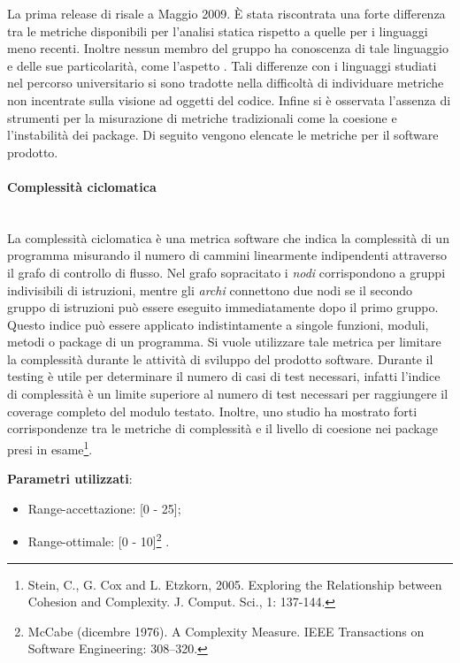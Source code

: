 		La prima release di  risale a Maggio 2009. È stata riscontrata una forte differenza tra le metriche disponibili per l'analisi statica rispetto a quelle per i linguaggi meno recenti. Inoltre nessun membro del gruppo ha conoscenza di tale linguaggio e delle sue particolarità, come l'aspetto . Tali differenze con i linguaggi studiati nel percorso universitario si sono tradotte nella difficoltà di individuare metriche non incentrate sulla visione ad oggetti del codice. Infine si è osservata l'assenza di strumenti per la misurazione di metriche tradizionali come la coesione e l'instabilità dei package.
		Di seguito vengono elencate le metriche per il software prodotto.
		
			\paragraph{Complessità ciclomatica}\mbox{} \\
				
			La complessità ciclomatica è una metrica software che indica la complessità di un programma misurando il numero di cammini linearmente indipendenti attraverso il grafo di controllo di flusso. Nel grafo sopracitato i \emph{nodi} corrispondono a gruppi indivisibili di istruzioni, mentre gli \emph{archi} connettono due nodi se il secondo gruppo di istruzioni può essere eseguito immediatamente dopo il primo gruppo.
			Questo indice può essere applicato indistintamente a singole funzioni, moduli, metodi o package di un programma.
			Si vuole utilizzare tale metrica per limitare la complessità durante le attività di sviluppo del prodotto software.
			Durante il testing è utile per determinare il numero di casi di test necessari, infatti l'indice di complessità è un limite superiore al numero di test necessari per raggiungere il coverage completo del modulo testato. Inoltre, uno studio ha mostrato forti corrispondenze tra le metriche di complessità e il livello di coesione nei package presi in esame\footnote{Stein, C., G. Cox and L. Etzkorn, 2005. Exploring the Relationship between Cohesion and Complexity. J. Comput. Sci., 1: 137-144.}.
			
			\textbf{Parametri utilizzati}:
			\begin{itemize}
				\item Range-accettazione: [0 - 25];
				\item Range-ottimale: [0 - 10]\footnote{McCabe (dicembre 1976). A Complexity Measure. IEEE Transactions on Software Engineering: 308–320.} .
			\end{itemize}
			

